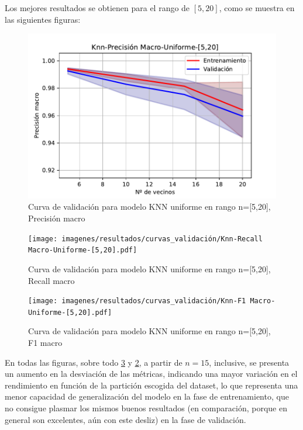 Los mejores resultados se obtienen para el rango de $\left[5,20\right]$, como se muestra en las siguientes figuras:

\begin{figure}[H]
	\centering
	\captionsetup{justification=centering}
	\includegraphics[width=\textwidth]{imagenes/resultados/curvas_validación/Knn-Precisión Macro-Uniforme-[5,20].pdf}
	\caption{Curva de validación para modelo KNN uniforme en rango n=[5,20], Precisión macro}
	\label{fig:res_knn_vc_precision_5,20}
\end{figure}

\begin{figure}[H]
	\centering
	\captionsetup{justification=centering}
	\texttt{[image: imagenes/resultados/curvas\_validación/Knn-Recall Macro-Uniforme-[5,20].pdf]}
	\caption{Curva de validación para modelo KNN uniforme en rango n=[5,20], Recall macro}
	\label{fig:res_knn_vc_recall_5,20}
\end{figure}

\begin{figure}[H]
	\centering
	\captionsetup{justification=centering}
	\texttt{[image: imagenes/resultados/curvas\_validación/Knn-F1 Macro-Uniforme-[5,20].pdf]}
	\caption{Curva de validación para modelo KNN uniforme en rango n=[5,20], F1 macro}
	\label{fig:res_knn_vc_f1_5,20}
\end{figure}

En todas las figuras, sobre todo \ref{fig:res_knn_vc_f1_5,20} y \ref{fig:res_knn_vc_recall_5,20}, a partir de $n=15$, inclusive, se presenta un aumento en la desviación de las métricas, indicando una mayor variación en el rendimiento en función de la partición escogida del dataset, lo que representa una menor capacidad de generalización del modelo en la fase de entrenamiento, que no consigue plasmar los mismos buenos resultados (en comparación, porque en general son excelentes, aún con este desliz) en la fase de validación.

